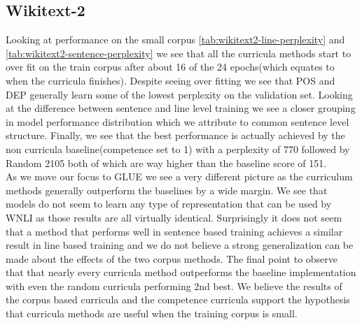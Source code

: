 \subsection{Wikitext-2}
Looking at performance on the small corpus \ref{tab:wikitext2-line-perplexity} and \ref{tab:wikitext2-sentence-perplexity} we see that all the curricula methods start to over fit on the train corpus after about 16 of the 24 epochs(which equates to when the curricula finishes). Despite seeing over fitting we see that POS and DEP generally learn some of the lowest perplexity on the validation set. Looking at the difference between sentence and line level training we see a closer grouping in model performance distribution which we attribute to common sentence level structure. Finally, we see that the best performance is actually achieved by the non curricula baseline(competence set to 1) with a perplexity of 770 followed by Random 2105 both of which are way higher than the baseline score of 151.\\
As we move our focus to GLUE we see a very different picture as the curriculum methods generally outperform the baselines by a wide margin. We see that models do not seem to learn any type of representation that can be used by WNLI as those results are all virtually identical. Surprisingly it does not seem that a method that performs well in sentence based training achieves a similar result in line based training and we do not believe a strong generalization can be made about the effects of the two corpus methods. The final point to observe that that nearly every curricula method outperforms the baseline implementation with even the random curricula performing 2nd best. We believe the results of the corpus based curricula and the competence curricula support the hypothesis that curricula methods are useful when the training corpus is small. 
